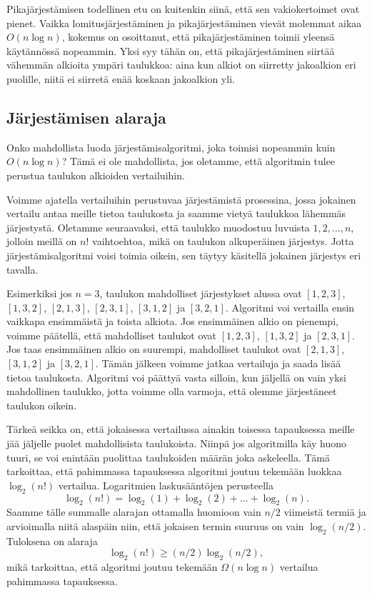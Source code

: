 Pikajärjestämisen todellinen etu on kuitenkin siinä,
että sen vakiokertoimet ovat pienet.
Vaikka lomitusjärjestäminen ja pikajärjestäminen vievät molemmat
aikaa $O(n \log n)$, kokemus on osoittanut, että
pikajärjestäminen toimii yleensä käytännössä nopeammin.
Yksi syy tähän on, että pikajärjestä\-minen siirtää vähemmän
alkioita ympäri taulukkoa: aina kun alkiot on siirretty
jakoalkion eri puolille, niitä ei siirretä enää koskaan
jakoalkion yli.

\subsection{Järjestämisen alaraja}

Onko mahdollista luoda järjestämisalgoritmi, joka toimisi
nopeammin kuin $O(n \log n)$?
Tämä ei ole mahdollista, jos oletamme, että algoritmin
tulee perustua taulukon alkioiden vertailuihin.

Voimme ajatella vertailuihin perustuvaa järjestämistä
prosessina, jossa jokainen vertailu antaa meille tietoa
taulukosta ja saamme vietyä taulukkoa lähemmäs järjestystä.
Oletamme seuraavaksi, että taulukko muodostuu luvuista
$1,2,\dots,n$, jolloin meillä on $n!$ vaihtoehtoa, mikä
on taulukon alkuperäinen järjestys.
Jotta järjestämisalgoritmi voisi toimia oikein,
sen täytyy käsitellä jokainen järjestys eri tavalla.

Esimerkiksi jos $n=3$, taulukon mahdolliset järjestykset alussa ovat
$[1,2,3]$, $[1,3,2]$, $[2,1,3]$, $[2,3,1]$, $[3,1,2]$ ja $[3,2,1]$.
Algoritmi voi vertailla ensin vaikkapa ensimmäistä ja toista alkiota.
Jos ensimmäinen alkio on pienempi, voimme päätellä,
että mahdolliset taulukot ovat $[1,2,3]$, $[1,3,2]$ ja $[2,3,1]$.
Jos taas ensimmäinen alkio on suurempi,
mahdolliset taulukot ovat $[2,1,3]$, $[3,1,2]$ ja $[3,2,1]$.
Tämän jälkeen voimme jatkaa vertailuja ja saada lisää tietoa taulukosta.
Algoritmi voi päättyä vasta silloin, kun jäljellä on vain yksi
mahdollinen taulukko, jotta voimme olla varmoja, että olemme
järjestäneet taulukon oikein.

Tärkeä seikka on, että jokaisessa vertailussa ainakin toisessa
tapauksessa meille jää jäljelle puolet mahdollisista taulukoista.
Niinpä jos algoritmilla käy huono tuuri, se voi enintään puolittaa
taulukoiden määrän joka askeleella.
Tämä tarkoittaa, että pahimmassa tapauksessa algoritmi joutuu
tekemään luokkaa $\log_2(n!)$ vertailua.
Logaritmien laskusääntöjen perusteella
\[
\log_2(n!) = \log_2(1)+\log_2(2)+\dots+\log_2(n).
\]
Saamme tälle summalle alarajan ottamalla huomioon vain
$n/2$ viimeistä termiä ja arvioimalla niitä alaspäin niin, 
että jokaisen termin suuruus on vain $\log_2(n/2)$. Tuloksena on alaraja
\[
\log_2(n!) \ge (n/2) \log_2(n/2),
\]
mikä tarkoittaa, että algoritmi joutuu
tekemään $\Omega(n \log n)$ vertailua pahimmassa tapauksessa.

